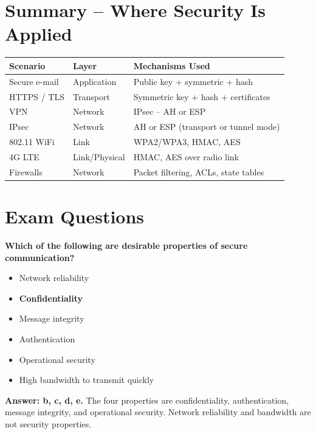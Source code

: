 \section{Summary -- Where Security Is Applied}

\begin{tcolorbox}[keybox, title=Security Techniques Applied Across Layers]
\begin{tabular}{lll}
\toprule
\textbf{Scenario} & \textbf{Layer} & \textbf{Mechanisms Used} \\
\midrule
Secure e-mail & Application & Public key + symmetric + hash \\
HTTPS / TLS & Transport & Symmetric key + hash + certificates \\
VPN & Network & IPsec -- AH or ESP \\
IPsec & Network & AH or ESP (transport or tunnel mode) \\
802.11 WiFi & Link & WPA2/WPA3, HMAC, AES \\
4G LTE & Link/Physical & HMAC, AES over radio link \\
Firewalls & Network & Packet filtering, ACLs, state tables \\
\bottomrule
\end{tabular}
\end{tcolorbox}

\section{Exam Questions}

\begin{tcolorbox}[exambox, title=V23 Q1.5.1 -- Properties of Secure Communication]
\textbf{Which of the following are desirable properties of secure communication?}
\begin{itemize}[noitemsep]
  \item[a)] Network reliability
  \item[b)] \textbf{Confidentiality} \checkmark
  \item[c)] Message integrity \checkmark
  \item[d)] Authentication \checkmark
  \item[e)] Operational security \checkmark
  \item[f)] High bandwidth to transmit quickly
\end{itemize}
\textbf{Answer: b, c, d, e.} The four properties are confidentiality, authentication, message integrity, and operational security. Network reliability and bandwidth are not security properties.
\end{tcolorbox}

